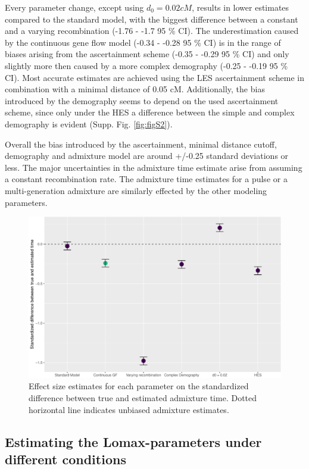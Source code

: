 \documentclass[]{article}
\begin{document}
Every parameter change, except using \(d_{0} = 0.02 cM\), results in lower estimates compared to the
standard model, with the biggest difference between a constant and a
varying recombination (-1.76 - -1.7 95 \% CI). The
underestimation caused by the continuous gene flow model (-0.34 -
-0.28 95 \% CI) is in the range of biases arising from the ascertainment scheme (-0.35 -
-0.29 95 \% CI) and only slightly more then caused by a more complex demography (-0.25 -
-0.19 95 \% CI). Most accurate estimates are achieved using the LES
ascertainment scheme in combination with a minimal distance of 0.05 cM.
Additionally, the bias introduced by the demography seems to depend on
the used ascertainment scheme, since only under the HES a difference
between the simple and complex demography is evident (Supp. Fig.
\ref{fig:figS2}).

Overall the bias introduced by the ascertainment, minimal distance
cutoff, demography and admixture model are  around +/-0.25 standard deviations or less. The major uncertainties in the admixture time
estimate arise from assuming a constant recombination rate. The
admixture time estimates for a pulse or a multi-generation admixture are similarly effected by the other modeling parameters.

\begin{figure}
\centering
\includegraphics{Admixture_Time_Inference_Paper_Draft_files/figure-latex/fig3-1.pdf}
\caption{\label{fig:fig3} Effect size estimates for each parameter on the standardized difference between true and estimated admixture time. Dotted horizontal line indicates unbiased admixture estimates.}
\end{figure}

\subsection{Estimating the Lomax-parameters under different conditions}\label{estimating the Lomax-parameters under different conditions}
\end{document}
